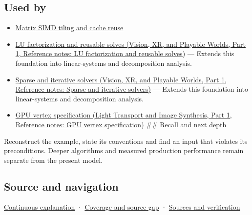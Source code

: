 \subsection{Used by}\label{appendix-ffdc1d4e5350-used-by}

\hypertarget{appendix-ffdc1d4e5350-used-by}{}

\begin{itemize}
\item
  \hyperref[appendix-1bfb7c657105]{Matrix SIMD tiling and cache reuse}
\item
  \href{../07-Vision-XR-and-Playable-Worlds-P01/main.pdf\#appendix-55e4b5b0a1e6}{LU factorization and reusable solves (Vision, XR, and Playable Worlds, Part 1, Reference notes: LU factorization and reusable solves)} --- Extends this foundation into linear-systems and decomposition analysis.
\item
  \href{../07-Vision-XR-and-Playable-Worlds-P01/main.pdf\#appendix-67c87a3d9e94}{Sparse and iterative solvers (Vision, XR, and Playable Worlds, Part 1, Reference notes: Sparse and iterative solvers)} --- Extends this foundation into linear-systems and decomposition analysis.
\item
  \href{../04-Light-Transport-and-Image-Synthesis-P01/main.pdf\#appendix-749ba51a6c25}{GPU vertex specification (Light Transport and Image Synthesis, Part 1, Reference notes: GPU vertex specification)} \#\# Recall and next depth
\end{itemize}

Reconstruct the example, state its conventions and find an input that violates its preconditions. Deeper algorithms and measured production performance remain separate from the present model.

\subsection{Source and navigation}\label{appendix-ffdc1d4e5350-source-and-navigation}

\hypertarget{appendix-ffdc1d4e5350-source-and-navigation}{}

\hyperref[01-foundations-i-ch018-keep-the-promises-visible-while-moving-between-representations]{Continuous explanation} · \hyperref[appendix-fd090d982a15-phase-7---parts-601-700]{Coverage and source gap} · \hyperref[appendix-a103e7846d21-phase-7---source-analysis-and-verification]{Sources and verification}
